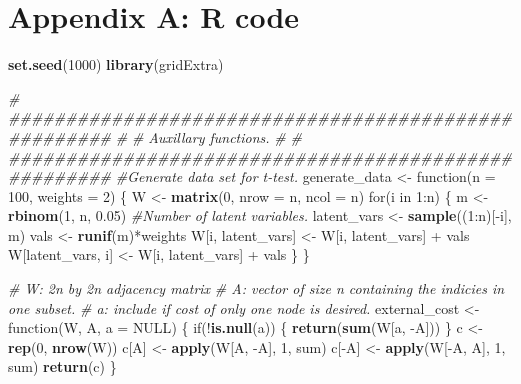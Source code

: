 \documentclass[11pt,]{article}
\newenvironment{Shaded}{\begin{snugshade}}{\end{snugshade}}
\newcommand{\KeywordTok}[1]{\textcolor[rgb]{0.13,0.29,0.53}{\textbf{{#1}}}}
\newcommand{\DataTypeTok}[1]{\textcolor[rgb]{0.13,0.29,0.53}{{#1}}}
\newcommand{\DecValTok}[1]{\textcolor[rgb]{0.00,0.00,0.81}{{#1}}}
\newcommand{\FloatTok}[1]{\textcolor[rgb]{0.00,0.00,0.81}{{#1}}}
\newcommand{\StringTok}[1]{\textcolor[rgb]{0.31,0.60,0.02}{{#1}}}
\newcommand{\CommentTok}[1]{\textcolor[rgb]{0.56,0.35,0.01}{\textit{{#1}}}}
\newcommand{\OtherTok}[1]{\textcolor[rgb]{0.56,0.35,0.01}{{#1}}}
\newcommand{\NormalTok}[1]{{#1}}
\begin{document}
\section*{Appendix A: R code}\label{appendix-a-r-code}

\begin{Shaded}
\begin{Highlighting}[]
\KeywordTok{set.seed}\NormalTok{(}\DecValTok{1000}\NormalTok{)}
\KeywordTok{library}\NormalTok{(gridExtra)}

\CommentTok{# #####################################################}
\CommentTok{#}
\CommentTok{# Auxillary functions.}
\CommentTok{#}
\CommentTok{# #####################################################}
\CommentTok{#Generate data set for t-test.}
\NormalTok{generate_data <-}\StringTok{ }\NormalTok{function(}\DataTypeTok{n =} \DecValTok{100}\NormalTok{, }\DataTypeTok{weights =} \DecValTok{2}\NormalTok{) \{}
  \NormalTok{W <-}\StringTok{ }\KeywordTok{matrix}\NormalTok{(}\DecValTok{0}\NormalTok{, }\DataTypeTok{nrow =} \NormalTok{n, }\DataTypeTok{ncol =} \NormalTok{n)}
    \NormalTok{for(i in }\DecValTok{1}\NormalTok{:n) \{}
      \NormalTok{m <-}\StringTok{ }\KeywordTok{rbinom}\NormalTok{(}\DecValTok{1}\NormalTok{, n, }\FloatTok{0.05}\NormalTok{) }\CommentTok{#Number of latent variables.}
      \NormalTok{latent_vars <-}\StringTok{ }\KeywordTok{sample}\NormalTok{((}\DecValTok{1}\NormalTok{:n)[-i], m)}
      \NormalTok{vals <-}\StringTok{ }\KeywordTok{runif}\NormalTok{(m)*weights}
      \NormalTok{W[i, latent_vars] <-}\StringTok{ }\NormalTok{W[i, latent_vars] +}\StringTok{ }\NormalTok{vals}
      \NormalTok{W[latent_vars, i] <-}\StringTok{ }\NormalTok{W[i, latent_vars] +}\StringTok{ }\NormalTok{vals}
    \NormalTok{\}}
\NormalTok{\}}

\CommentTok{# W: 2n by 2n adjacency matrix}
\CommentTok{# A: vector of size n containing the indicies in one subset.}
\CommentTok{# a: include if cost of only one node is desired.}
\NormalTok{external_cost <-}\StringTok{ }\NormalTok{function(W, A, }\DataTypeTok{a =} \OtherTok{NULL}\NormalTok{) \{}
  \NormalTok{if(!}\KeywordTok{is.null}\NormalTok{(a)) \{}
    \KeywordTok{return}\NormalTok{(}\KeywordTok{sum}\NormalTok{(W[a, -A]))}
  \NormalTok{\}}
  \NormalTok{c <-}\StringTok{ }\KeywordTok{rep}\NormalTok{(}\DecValTok{0}\NormalTok{, }\KeywordTok{nrow}\NormalTok{(W))}
  \NormalTok{c[A] <-}\StringTok{ }\KeywordTok{apply}\NormalTok{(W[A, -A], }\DecValTok{1}\NormalTok{, sum)}
  \NormalTok{c[-A] <-}\StringTok{ }\KeywordTok{apply}\NormalTok{(W[-A, A], }\DecValTok{1}\NormalTok{, sum)}
  \KeywordTok{return}\NormalTok{(c)}
\NormalTok{\}}


\end{Highlighting}
\end{Shaded}
\end{document}
